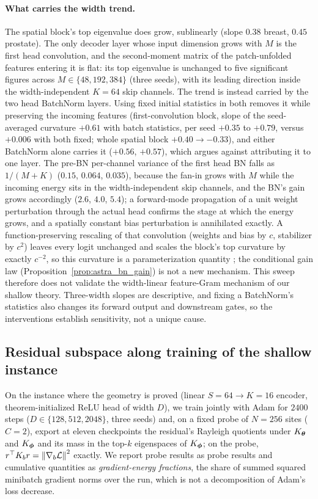 \paragraph{What carries the width trend.}
The spatial block's top eigenvalue does grow, sublinearly (slope $0.38$
breast, $0.45$ prostate). The only decoder layer whose input dimension grows
with $M$ is the first head convolution, and the second-moment matrix of the
patch-unfolded features entering it is flat: its top eigenvalue is unchanged
to five significant figures across $M\in\{48,192,384\}$ (three seeds), with
its leading direction inside the width-independent $K=64$ skip channels. The
trend is instead carried by the two head BatchNorm layers. Using fixed
initial statistics in both removes it while preserving the incoming features
(first-convolution block, slope of the seed-averaged curvature $+0.61$
with batch statistics, per seed $+0.35$ to $+0.79$, versus $+0.006$ with
both fixed; whole spatial block $+0.40\to-0.33$), and either BatchNorm alone carries it ($+0.56$,
$+0.57$), which argues against attributing it to one layer. The pre-BN
per-channel variance of the first head BN falls as $1/(M{+}K)$ ($0.15$,
$0.064$, $0.035$), because the fan-in grows with $M$ while the incoming
energy sits in the width-independent skip channels, and the BN's gain grows
accordingly ($2.6$, $4.0$, $5.4$); a forward-mode propagation of a unit
weight perturbation through the actual head confirms the stage at which the
energy grows, and a spatially constant bias perturbation is annihilated
exactly. A function-preserving rescaling of that convolution (weights and
bias by $c$, stabilizer by $c^2$) leaves every logit unchanged and scales
the block's top curvature by exactly $c^{-2}$, so this curvature is a
parameterization quantity \citep{vanlaarhoven2017l2}; the conditional gain
law (Proposition~\ref{prop:astra_bn_gain}) is not a new mechanism. This
sweep therefore does not validate the width-linear feature-Gram mechanism of
our shallow theory. Three-width slopes are descriptive, and fixing a
BatchNorm's statistics also changes its forward output and downstream gates,
so the interventions establish sensitivity, not a unique cause.

\subsection{Residual subspace along training of the shallow instance}
\label{sec:residual}

On the instance where the geometry is proved (linear $S=64\to K=16$
encoder, theorem-initialized ReLU head of width $D$), we train jointly with
Adam for $2400$ steps ($D\in\{128,512,2048\}$, three seeds) and, on a fixed
probe of $N=256$ sites ($C=2$), export at eleven checkpoints the residual's
Rayleigh quotients under $K_{\boldsymbol{\theta}}$ and $K_{\boldsymbol{\phi}}$ and its mass in the
top-$k$ eigenspaces of $K_{\boldsymbol{\phi}}$; on the probe,
$r^\top K_br=\left\lVert\nabla_b\mathcal{L}\right\rVert^2$ exactly. We report probe results as
probe results and cumulative quantities as \emph{gradient-energy
fractions}, the share of summed squared minibatch gradient norms over the
run, which is not a decomposition of Adam's loss decrease.

